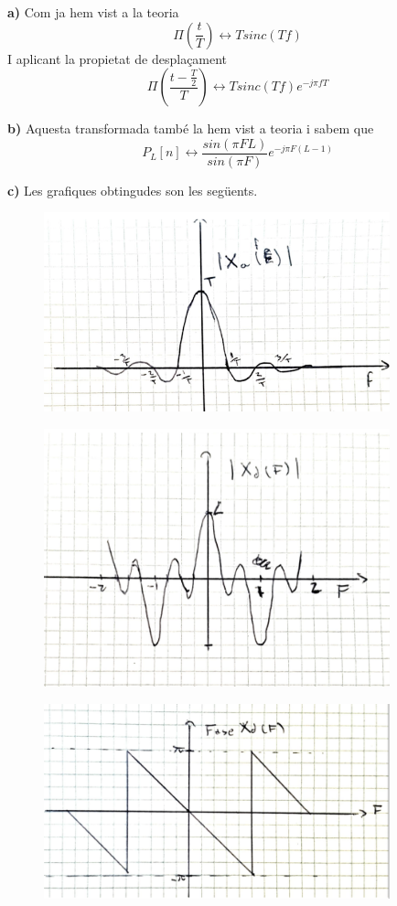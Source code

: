 \documentclass[12pt, a4papre]{article}
\begin{document}
	\textbf{a)} Com ja hem vist a la teoria
	\[
	\Pi(\frac{t}{T}) \leftrightarrow Tsinc(Tf)
	\]
	I aplicant la propietat de desplaçament
	\[
	\Pi(\frac{t - \frac{T}{2}}{T}) \leftrightarrow Tsinc(Tf)e^{-j\pi fT}
	\]
	
	\textbf{b)} Aquesta transformada també la hem vist a teoria i sabem que
	\[
	P_L[n] \leftrightarrow \frac{sin(\pi F L)}{sin(\pi F)}e^{-j\pi F(L - 1)}
	\]
	
	\textbf{c)} Les grafiques obtingudes son les següents.
	
	\begin{figure}[H]
		\begin{center}
		\includegraphics[width=100mm]{SSIS2.png}
		\end{center}
	\end{figure}
	
	\begin{figure}[H]
		\begin{center}
		\includegraphics[width=100mm]{SSIS1.png}
		\end{center}
	\end{figure}
	
	\begin{figure}[H]
		\begin{center}
		\includegraphics[width=100mm]{SSIS3.png}
		\end{center}
	\end{figure}
	
\end{document}
